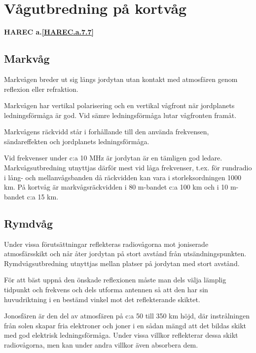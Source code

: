 \section{Vågutbredning på kortvåg}
\textbf{
HAREC a.\ref{HAREC.a.7.7}\label{myHAREC.a.7.7}
}

\subsection{Markvåg}

Markvågen breder ut sig längs jordytan utan kontakt med atmosfären
genom reflexion eller refraktion.

Markvågen har vertikal polarisering och en vertikal vågfront när
jordplanets ledningsförmåga är god. Vid sämre ledningsförmåga lutar
vågfronten framåt.

Markvågens räckvidd står i forhållande till den använda frekvensen,
sändareffekten och jordplanets ledningsförmåga.

Vid frekvenser under c:a 10 MHz är jordytan är en tämligen god
ledare. Markvågsutbredning utnyttjas därför mest vid låga frekvenser,
t.ex. för rundradio i lång- och mellanvågsbanden då räckvidden kan
vara i storleksordningen 1000 km. På kortvåg är markvågsräckvidden i
80 m-bandet c:a 100 km och i 10 m-bandet c:a 15 km.

\subsection{Rymdvåg}

Under vissa förutsättningar reflekteras radiovågorna mot joniserade
atmosfärsskikt och når åter jordytan på stort avstånd från
utsändningspunkten. Rymdvågsutbredning utnyttjas mellan platser på
jordytan med stort avstånd.

För att bäst uppnå den önskade reflexionen måste man dels välja
lämplig tidpunkt och frekvens och dels utforma antennen så att den har
sin huvudriktning i en bestämd vinkel mot det reflekterande skiktet.

Jonosfären är den del av atmosfären på c:a 50 till 350 km höjd, där
instrålningen från solen skapar fria elektroner och joner i en sådan
mängd att det bildas skikt med god elektrisk ledningsförmåga. Under
vissa villkor reflekterar dessa skikt radiovågorna, men kan under
andra villkor även absorbera dem.

